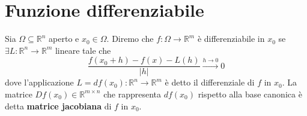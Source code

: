 \documentclass[openany]{book}
\begin{document}
\section{Funzione differenziabile}
\begin{definition}
Sia $\Omega \subseteq \mathbb{R}^n$ aperto e $x_0 \in \Omega$. Diremo che $f: \Omega \to \mathbb{R}^m$ è differenziabile in $x_0$ se $\exists L: \mathbb{R}^n \to \mathbb{R}^m$ lineare tale che
$$
\frac{f(x_0 + h)-f(x) - L(h)}{|h|} \stackrel{h \to 0}{\to} 0
$$
dove l'applicazione $L = df(x_0): \mathbb{R}^n \to \mathbb{R}^m$ è detto il differenziale di $f$ in $x_0$. La matrice $Df(x_0) \in \mathbb{R}^{m \times n}$ che rappresenta $df(x_0)$ rispetto alla base canonica è detta \textbf{matrice jacobiana} di $f$ in $x_0$.
\end{definition}
\end{document}

